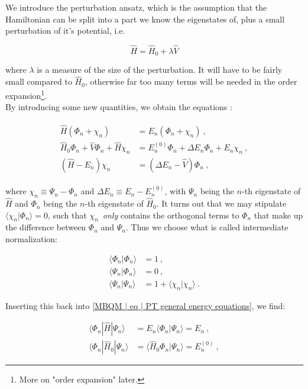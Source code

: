 \documentclass[10pt,twoside]{report}
\begin{document}
	We introduce the perturbation ansatz, which is the assumption that the Hamiltonian can be split into a part we know the eigenstates of, plus a small perturbation of it's potential, i.e.
	
	\begin{equation}
	\hat{H} = \hat{H}_0 + \lambda\hat{V}
	\end{equation}
	
	\noindent where $\lambda$ is a measure of the size of the perturbation. It will have to be fairly small compared to $\hat{H}_0$, otherwise far too many terms will be needed in the order expansion\footnote{More on "order expansion" later.}.\\
	
	By introducing some new quantities, we obtain the equations \cite{ShavittBartlett09}:
	
	\begin{align}
		\begin{split}
			\hat{H}(\Phi_n + \chi_n) &= E_n(\Phi_n+\chi_n) \:,\\
			\hat{H}_0\Phi_n + \hat{V}\Phi_n + \hat{H}\chi_n &= E_n^{(0)}\Phi_n + \Delta E_n\Phi_n + E_n\chi_n \:,\\
			(\hat{H}-E_n)\chi_n &= (\Delta E_n - \hat{V})\Phi_n \:,
		\end{split}
		\label{MBQM | eq | PT general energy equations}
	\end{align}
	
	\noindent where $\chi_n \equiv \Psi_n-\Phi_n$ and $\Delta E_n \equiv E_n - E_n^{(0)}$, with $\Psi_n$ being the $n$-th eigenstate of $\hat{H}$ and $\Phi_n$ being the $n$-th eigenstate of $\hat{H}_0$. It turns out that we may stipulate $\langle\chi_n|\Phi_n\rangle = 0$, such that $\chi_n$ \emph{only} contains the orthogonal terms to $\Phi_n$ that make up the difference between $\Phi_n$ and $\Psi_n$. Thus we choose what is called intermediate normalization:
	
	\begin{align}
		\langle\Phi_n|\Phi_n\rangle &= 1 \:,\\
		\langle\Psi_n|\Phi_n\rangle &= 0 \:,\\ 
		\langle\Psi_n|\Psi_n\rangle &= 1 + \langle\chi_n|\chi_n\rangle\:.
	\end{align}
	
	Inserting this back into \ref{MBQM | eq | PT general energy equations}, we find:
	
	\begin{align}
		\langle\Phi_n|\hat{H}|\Psi_n\rangle &= E_n\langle\Phi_n|\Psi_n\rangle = E_n \:,\\
		\langle\Phi_n|\hat{H}_0|\Psi_n\rangle &= \langle\hat{H}_0\Phi_n|\Psi_n\rangle = E_n^{(0)} \:,
	\end{align}
	
\end{document}
